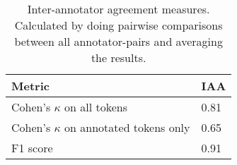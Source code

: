 \documentclass[../report.tex]{subfiles}
\begin{document}
\begin{table}[t]
\begin{tabular}{@{}p{6cm}p{1.25cm}@{}}
\toprule
Metric &  IAA  \\ \midrule
Cohen's $\kappa$ on all tokens & 0.81 \\ 
Cohen's $\kappa$ on annotated tokens only & 0.65 \\
F1 score & 0.91 \\ \bottomrule
\end{tabular}
\caption{
    Inter-annotator agreement measures. 
    Calculated by doing pairwise comparisons between all annotator-pairs and averaging the results.
}
\label{table:iaa}
\end{table}
\end{document}
